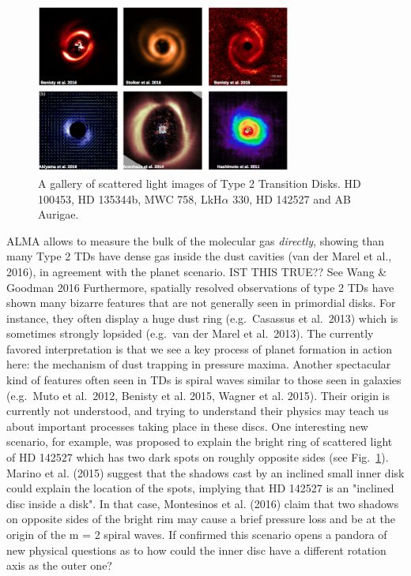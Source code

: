 \documentclass[10pt,fleqn,twoside]{article}
\begin{document}
\begin{figure}
\centerline{\includegraphics[width=0.75\textwidth]{figures/Type2TD_Scat.png}}
\caption{\label{fig-type2-scat}
  A gallery of scattered light images of Type 2 Transition Disks. 
 HD 100453, HD 135344b,
MWC 758, LkH$\alpha$ 330, HD 142527 and AB Aurigae.} 
\end{figure}

ALMA allows to measure the bulk of the molecular gas {\it
  directly}, showing than many Type 2 TDs have dense gas inside the
dust cavities (van der Marel et al., 2016), in agreement with the
planet scenario. {\color{red} IST THIS TRUE?? See Wang \& Goodman 2016}
Furthermore, spatially resolved observations of type
2 TDs have shown many bizarre features that are
not generally seen in primordial disks. For instance, they
  often display a huge dust ring (e.g.~Casassus et al.~2013)
  which is sometimes strongly lopsided (e.g.~van der Marel et al.~2013). The currently favored interpretation is that we see a
  key process of planet formation in action here: the mechanism of dust
  trapping in pressure maxima. Another spectacular kind of features often
  seen in TDs is spiral waves similar to those seen in galaxies
  (e.g.~Muto et al.~2012, Benisty et al. 2015, Wagner et al. 2015). Their origin is currently not
  understood, and trying to understand their physics may teach us about
important processes taking place in these discs. One interesting new
scenario, for example, was proposed to explain the bright ring of scattered light of
HD 142527 which has two dark spots on roughly opposite sides (see Fig.~\ref{fig-type2-scat}). Marino
et al. (2015) suggest that the shadows cast by an inclined small inner
disk could explain the location of the spots, implying that HD 142527
is an "inclined disc inside a disk". In that case, Montesinos et
al. (2016) claim that two shadows on opposite sides of the
bright rim may cause a brief pressure loss and be at the origin of the
m = 2 spiral waves. If confirmed this scenario opens a pandora of new
physical questions as to how could the inner disc have a different
rotation axis as the outer one?  \\
\end{document}
